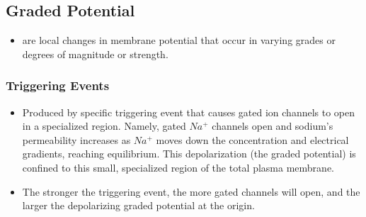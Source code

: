 \documentclass{article}
\numberwithin{equation}{section}
\begin{document}
\subsection{Graded Potential}
\begin{itemize}
    \item {} are local changes in membrane potential that occur in varying grades or degrees of magnitude or strength.
\end{itemize}
\subsubsection{Triggering Events}
\begin{itemize}
    \item Produced by specific triggering event that causes gated ion channels to open in a specialized region. Namely, gated $Na^+$ channels open and sodium's permeability increases as $Na^+$ moves down the concentration and electrical gradients, reaching equilibrium. This depolarization (the graded potential) is confined to this small, specialized region of the total plasma membrane.
    \item The stronger the triggering event, the more gated channels will open, and the larger the depolarizing graded potential at the origin.
\end{itemize}
\end{document}

